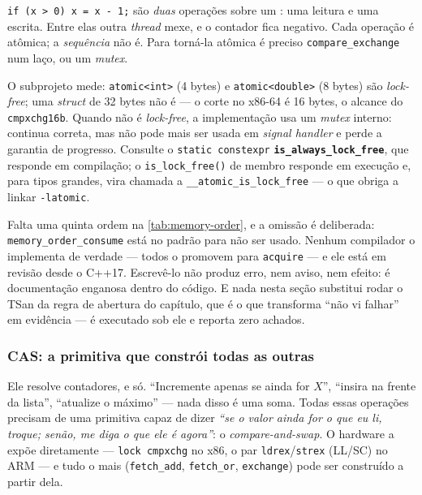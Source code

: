 \begin{armadilha}
\texttt{if (x > 0) x = x - 1;} são \emph{duas} operações sobre um
: uma leitura e uma escrita. Entre elas outra
\emph{thread} mexe, e o contador fica negativo. Cada operação é atômica; a
\emph{sequência} não é. Para torná-la atômica é preciso
\texttt{compare\_exchange} num laço, ou um \emph{mutex}.
\end{armadilha}

\begin{armadilha}
O subprojeto mede: \texttt{atomic<int>} (4 bytes) e \texttt{atomic<double>}
(8 bytes) são \emph{lock-free}; uma \emph{struct} de 32 bytes não é --- o corte
no x86-64 é 16 bytes, o alcance do \texttt{cmpxchg16b}. Quando não é
\emph{lock-free}, a implementação usa um \emph{mutex} interno: continua correta,
mas não pode mais ser usada em \emph{signal handler} e perde a garantia de
progresso. Consulte o \texttt{static constexpr}
\textbf{\texttt{is\_always\_lock\_free}}, que responde em compilação; o
\texttt{is\_lock\_free()} de membro responde em execução e, para tipos grandes,
vira chamada a \texttt{\_\_atomic\_is\_lock\_free} --- o que obriga a linkar
\texttt{-latomic}.
\end{armadilha}

Falta uma quinta ordem na \cref{tab:memory-order}, e a omissão é deliberada:
\texttt{memory\_order\_consume} está no padrão para não ser usado. Nenhum
compilador o implementa de verdade --- todos o promovem para \texttt{acquire}
--- e ele está em revisão desde o C++17. Escrevê-lo não produz erro, nem aviso,
nem efeito: é documentação enganosa dentro do código. E nada nesta seção
substitui rodar o TSan da regra de abertura do capítulo, que é o que transforma
``não vi falhar'' em evidência ---  é executado sob ele e
reporta zero achados.

\subsubsection{CAS: a primitiva que constrói todas as outras}
\label{sec:cas}

\begin{porque}
Ele resolve contadores, e só. ``Incremente apenas se ainda for $X$'', ``insira
na frente da lista'', ``atualize o máximo'' --- nada disso é uma soma. Todas
essas operações precisam de uma primitiva capaz de dizer \emph{``se o valor
ainda for o que eu li, troque; senão, me diga o que ele é agora''}: o
\emph{compare-and-swap}. O hardware a expõe diretamente --- \texttt{lock
cmpxchg} no x86, o par \texttt{ldrex}/\texttt{strex} (LL/SC) no ARM --- e tudo o
mais (\texttt{fetch\_add}, \texttt{fetch\_or}, \texttt{exchange}) pode ser
construído a partir dela.
\end{porque}

